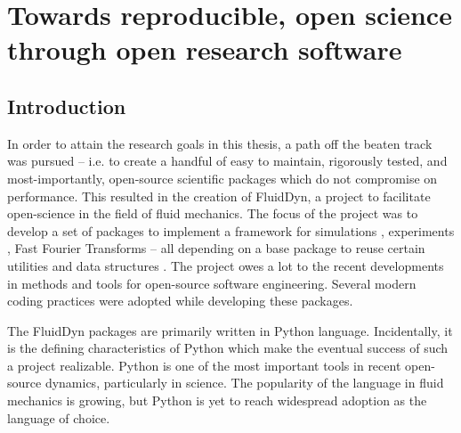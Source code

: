 \chapter{Towards reproducible, open science through open research software}
\section{Introduction}



%


In order to attain the research goals in this thesis, a path off the beaten
track was pursued -- i.e. to create a handful of easy to maintain, rigorously
tested, and most-importantly, open-source scientific packages which do not
compromise on performance.
%
This resulted in the creation of FluidDyn, a project to facilitate open-science
in the field of fluid mechanics.
%
The focus of the project was to develop a set of packages to implement a
framework for simulations \citep{fluidsim}, experiments
\citep{augier_fluidimage_2016,augier_fluidlab_nodate}, Fast Fourier Transforms
\citep{fluidfft} -- all depending on a base package to reuse certain utilities
and data structures \citep{fluiddyn}.
%
The project owes a lot to the recent developments in methods and tools for
open-source software engineering.
%
Several modern coding practices were adopted while developing these packages.


The FluidDyn packages are primarily written in Python language. Incidentally,
it is the defining characteristics of Python which make the eventual success of
such a project realizable.
%
Python is one of the most important tools in recent open-source dynamics,
particularly in science.
%
The popularity of the language in fluid mechanics is growing, but Python is yet
to reach widespread adoption as the language of choice.

